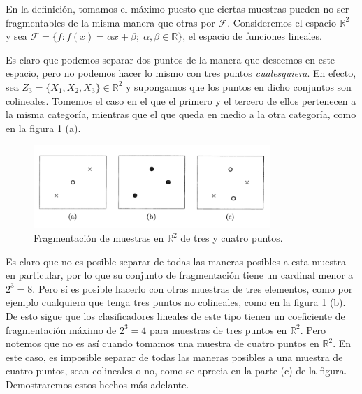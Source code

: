 \documentclass{article}
\begin{document}
En la definición, tomamos el máximo puesto que ciertas muestras pueden no ser fragmentables de la misma manera que otras por \(\mathcal{F}\). 
Consideremos el espacio $\mathbb{R}^2$ y sea $\mathcal{F}=\{f: f(x)= \alpha x + \beta; \; \alpha, \beta\in\mathbb{R}\}$, el espacio
de funciones lineales.\newline

Es claro que podemos separar dos puntos de la manera que deseemos en este espacio, pero no podemos hacer lo mismo con tres puntos \textit{cualesquiera}.
En efecto, sea $Z_3 = \{X_1,X_2,X_3\} \in \mathbb{R}^2$ y supongamos que los puntos en dicho conjuntos son colineales. Tomemos el caso en el que el primero y el tercero de ellos pertenecen a la misma categoría,
mientras que el que queda en medio a la otra categoría, como en la figura \ref{fragmentacion perceptron} (a).\newline 

\begin{figure}[ht]
    \centering
    \includegraphics[width=0.8\textwidth]{Images/5.png}
    
    \caption{Fragmentación de muestras en $\mathbb{R}^2$ de tres y cuatro puntos.}
    \label{fragmentacion perceptron}
    \end{figure}

Es claro que no es posible separar de todas las maneras posibles a esta muestra en particular, por lo que su conjunto de fragmentación
tiene un cardinal menor a $2^3=8$. Pero sí es posible hacerlo con otras muestras de tres elementos, como por ejemplo cualquiera que tenga 
tres puntos no colineales, como en la figura \ref{fragmentacion perceptron} (b). De esto sigue
que los clasificadores lineales de este tipo tienen un coeficiente de fragmentación máximo de $2^3=4$ para muestras de tres puntos en $\mathbb{R}^2$.
Pero notemos que no es así cuando tomamos una muestra de cuatro puntos en $\mathbb{R}^2$. En este caso, es imposible separar de todas las maneras posibles
a una muestra de cuatro puntos, sean colineales o no, como se aprecia en la parte (c) de la figura. Demostraremos estos hechos más adelante.\newline
\end{document}
